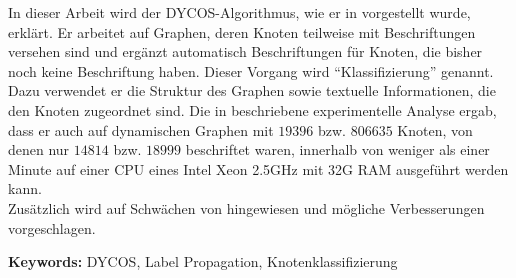 In dieser Arbeit wird der DYCOS-Algorithmus, wie er in \cite{aggarwal2011} vorgestellt wurde, erklärt.
Er arbeitet auf Graphen, deren Knoten teilweise mit 
Beschriftungen versehen sind und ergänzt automatisch Beschriftungen
für Knoten, die bisher noch keine Beschriftung haben. Dieser Vorgang
wird \enquote{Klassifizierung} genannt. Dazu verwendet er die
Struktur des Graphen sowie textuelle Informationen, die den Knoten 
zugeordnet sind. Die in \cite{aggarwal2011} beschriebene experimentelle
Analyse ergab, dass er auch auf dynamischen Graphen mit $\num{19396}$ 
bzw. $\num{806635}$ Knoten, von denen nur $\num{14814}$ bzw. $\num{18999}$
beschriftet waren, innerhalb von weniger als einer Minute auf einer
CPU eines Intel Xeon 2.5GHz mit 32G RAM ausgeführt
werden kann.\\
Zusätzlich wird auf Schwächen von \cite{aggarwal2011} hingewiesen
und mögliche Verbesserungen vorgeschlagen.

\textbf{Keywords:} DYCOS, Label Propagation, Knotenklassifizierung
